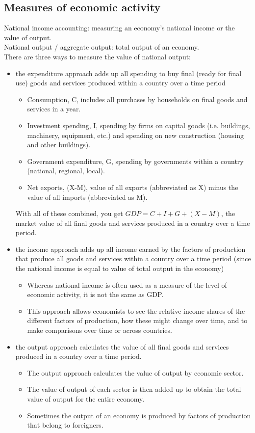 \documentclass[a4paper,12pt]{article}
\begin{document}
\subsection{Measures of economic activity}
National income accounting: measuring an economy's national income or the value of output.\\
National output / aggregate output: total output of an economy.\\
There are three ways to measure the value of national output:
\begin{itemize}
  \item the expenditure approach adds up all spending to buy final (ready for final use) goods and services produced within a country over a time period
  \begin{itemize}
    \item Consumption, C, includes all purchases by households on final goods and services in a year.
    \item Investment spending, I, spending by firms on capital goods (i.e. buildings, machinery, equipment, etc.) and spending on new construction (housing and other buildings).
    \item Government expenditure, G, spending by governments within a country (national, regional, local).
    \item Net exports, (X-M), value of all exports (abbreviated as X) minus the value of all imports (abbreviated as M).
  \end{itemize}
  With all of these combined, you get $GDP=C+I+G+(X-M)$, the market value of all final goods and services produced in a country over a time period.
  \item the income approach adds up all income earned by the factors of production that produce all goods and services within a country over a time period (since the national income is equal to value of total output in the economy)
  \begin{itemize}
    \item Whereas national income is often used as a measure of the level of economic activity, it is not the same as GDP. 
    \item This approach allows economists to see the relative income shares of the different factors of production, how these might change over time, and to make comparisons over time or across countries.
  \end{itemize}
  \item the output approach calculates the value of all final goods and services produced in a country over a time period.
  \begin{itemize}
    \item The output approach calculates the value of output by economic sector.
    \item The value of output of each sector is then added up to obtain the total value of output for the entire economy.
    \item Sometimes the output of an economy is produced by factors of production that belong to foreigners.
  \end{itemize}
\end{itemize}
\end{document}
